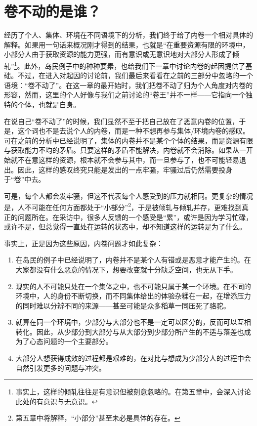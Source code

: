 \documentclass[UTF8,a4paper,fontset=windows,11pt,openany]{ctexbook}
\begin{document}
\section{卷不动的是谁？}

经历了个人、集体、环境在不同语境下的分析，我们终于给了内卷一个相对具体的解释。如果用一句话来概况刚才得到的结果，也就是“在重要资源有限的环境中，小部分人由于获取资源的能力更强，而有意识或无意识地对大部分人形成了倾轧”\footnote{事实上，这样的倾轧往往是有意识但被刻意忽略的。在第五章中，会深入讨论此处的有意识与无意识。}。此外，岛民例子中的种种要素，也给我们下一章中讨论内卷的起因提供了基础。不过，在进入对起因的讨论前，我们最后来看看在之前的三部分中忽略的一个语境：“卷不动了”。在这一章的最开始时，我们把卷不动了归为个人角度对内卷的形容，然而，这里的个人好像与我们之前讨论的“卷王”并不一样——它指向一个独特的个体，也就是自身。

在说自己“卷不动了”的时候，我们显然不至于把自己放在了恶意内卷的位置，于是，这个词也不是去说个人的内卷，而是一种不想再参与集体/环境内卷的感叹。可在之前的分析中已经说明了，集体的内卷并不是某个个体的结果，而是资源有限与获取能力不均的矛盾。只要这样的矛盾不能解决，内卷就不会消除。如果从一开始就不在意这样的资源，根本就不会参与其中，而一旦参与了，也不可能轻易退出。因此，这样的感叹终究只能是发出的一点牢骚，牢骚过后仍然需要投身于“卷”中去。

可是，每个人都会发牢骚，但这不代表每个人感受到的压力就相同。更复杂的情况是，人不可能在任何方面都处于“小部分”\footnote{第五章中将解释，“小部分”甚至未必是具体的存在。}，于是被倾轧与倾轧并存，更难找到真正的问题所在。在采访中，很多人反馈的一个感受是“累”，或许是因为学习忙碌，或许不是，但总觉得一直处在运转的状态中，却不知道这样的运转是为了什么。

事实上，正是因为这些原因，内卷问题才如此复杂：
\begin{enumerate}
    \item 在岛民的例子中已经说明了，内卷并不是某个人有错或是恶意才能产生的。在大家都没有什么恶意的情况下，想要改变就十分缺乏空间，也无从下手。
    \item 现实的人不可能只处在一个集体之中，也不可能只属于某一个环境。在不同的环境中，人的身份不断切换，而不同集体给出的体验杂糅在一起，在增添压力的同时难以分辨不同的来源——甚至可能是众多稻草一同压死了骆驼。
    \item 就算在同一个环境中，少部分与大部分也不是一定可以区分的，反而可以互相转化。因此，从少部分到大部分与从大部分到少部分所产生的不适与落差也成为了心态问题的一个主要部分。
    \item 大部分人想获得成效的过程都是艰难的，在对比与想成为少部分人的过程中会自然引发更多的问题与冲突。
\end{enumerate}
\end{document}
